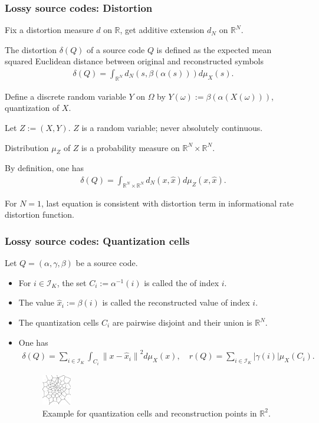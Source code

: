 \begin{frame}\frametitle{Lossy source codes: Distortion}
\bit
\item Fix a distortion measure $d$ on $\mathbb{R}$, get additive extension $d_N$ on $\mathbb{R}^N$. 
\item The distortion $\delta(Q)$ of a source code $Q$ is defined as the expected mean squared Euclidean distance between original and 
reconstructed symbols  
\begin{align*}
\delta(Q)=\int_{\mathbb{R}^N}d_N(s,\beta(\alpha(s)))d\mu_X(s).
\end{align*}
\item Define a discrete random variable $Y$ on $\Omega$ by $Y(\omega):=\beta(\alpha(X(\omega)))$, quantization of $X$.
\item Let $Z:=(X,Y)$. $Z$ is a random variable; never absolutely continuous. 
\item Distribution $\mu_{Z}$ of $Z$ is a probability measure on $\mathbb{R}^{N}\times\mathbb{R}^N$.
\item By definition, one has
\begin{align*}
\delta(Q)=\int_{\mathbb{R}^N\times\mathbb{R}^N}d_N(x,\hat{x})d\mu_Z(x,\hat{x}).
\end{align*}
\item For $N=1$, last equation is consistent with distortion term in informational rate distortion function. 
\eit 
\end{frame}


\begin{frame}\frametitle{Lossy source codes: Quantization cells}
Let $Q=(\alpha,\gamma,\beta)$ be a source code. 
\begin{itemize}
\item For $i\in\mathcal{I}_K$, the set 
$C_i:=\alpha^{-1}(i) $
is called the  of index $i$.
\item The value 
$\hat{x}_i:=\beta(i)$ is called the reconstructed value of index $i$. 
\item The quantization cells $C_i$ are pairwise disjoint and their union is $\mathbb{R}^N$. 
\item One has 
\begin{align}\label{RDQuantCells}
\delta(Q)=\sum_{i\in\mathcal{I}_K}\int_{C_i}\left\|x-\hat{x}_i\right\|^2d\mu_X(x),\quad r(Q)=\sum_{i\in\mathcal{I}_K}|\gamma(i)|\mu_X(C_i).
\end{align}
\begin{figure}
\centering
\includegraphics[width=0.12\textwidth]{RD_V/quant_cells.png}
\captionsetup{labelformat=empty}
\caption{Example for quantization cells and reconstruction points in $\mathbb{R}^2$.}
\end{figure}
\end{itemize}
\end{frame}




